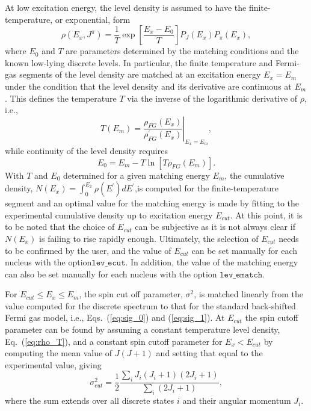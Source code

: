 \documentclass[
10pt,
showpacs,preprintnumbers,footinbib,
amsfonts,amsmath,amssymb,
aps,
prc,twocolumn,groupedaddress,superscriptaddress,
showkeys,
nofootinbib
]{revtex4-1}
\begin{document}
At low excitation energy, the level density is assumed to have the finite-temperature, or exponential, form
\begin{equation}
\rho(E_x,J^\pi) = \frac{1}{T}\exp\left [ \frac{E_x - E_0}{T}\right ] P_J(E_x) P_\pi(E_x),
\label{eq:rho_T}
\end{equation}
where $E_0$ and $T$ are parameters determined by the matching conditions and the known low-lying discrete levels. In particular, the finite temperature and Fermi-gas segments of the level density are matched at an excitation energy $E_x=E_m$ under the condition that the level density and its derivative are continuous at $E_m$. This defines the temperature $T$ via the inverse of the logarithmic derivative of $\rho$, i.e.,
\begin{equation}
T(E_m) = \left. \frac{\rho_{FG}(E_x)}{\rho^\prime_{FG}(E_x)} \right |_{E_x = E_m},
\end{equation}
while continuity of the level density requires
\begin{equation}
E_0 = E_m -T\ln\left [ T\rho_{FG}(E_m)\right].
\end{equation}
With $T$ and $E_0$ determined for a given matching energy $E_m$, the cumulative density, $N(E_x) = \int_0^{E_x} \rho(E^\prime)dE^\prime$,is computed for the finite-temperature segment and an optimal value for the matching energy is made by fitting to the experimental cumulative density up to excitation energy $E_{cut}$. At this point, it is to be noted that the choice of $E_{cut}$ can be subjective as it is not always clear if $N(E_x)$ is failing to rise rapidly enough. Ultimately, the selection of $E_{cut}$ needs to be confirmed by the user, and the value of $E_{cut}$ can be set manually for each nucleus with the option${\texttt{lev\_ecut}}$. In addition, the value of the matching energy can also be set manually for each nucleus with the option ${\texttt{lev\_ematch}}$.

For $E_{cut} \le E_x \le E_m$, the spin cut off parameter, $\sigma^2$, is matched linearly from the value computed for the discrete spectrum to that for the standard back-shifted Fermi gas model, i.e., Eqs.~(\ref{eq:sig_0}) and (\ref{eq:sig_1}). At $E_{cut}$ the spin cutoff parameter can be found by assuming a constant temperature level density, Eq.~(\ref{eq:rho_T}), and a constant spin cutoff parameter for $E_x < E_{cut}$ by computing the mean value of $J(J+1)$ and setting that equal to the experimental value, giving
\begin{equation}
\sigma^2_{cut} = \frac{1}{2}\frac{\sum_i J_i(J_i+1)(2J_i+1)}{\sum_i (2J_i+1)},
\end{equation}
where the sum extends over all discrete states $i$ and their angular momentum $J_i$.
\end{document}
